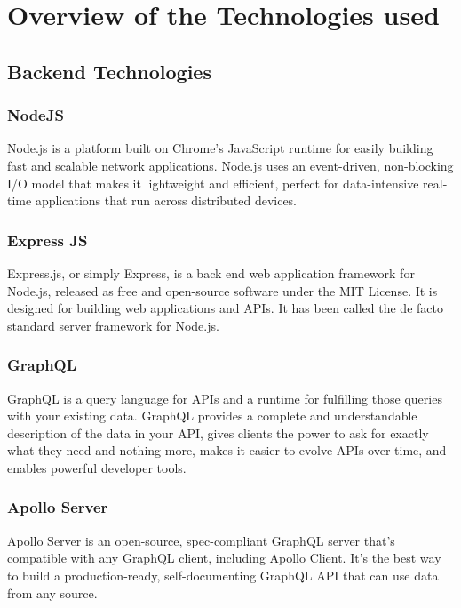 \section{Overview of the Technologies used}

\subsection{Backend Technologies}

    \subsubsection{NodeJS}
    Node.js is a platform built on Chrome's JavaScript runtime for easily building fast and scalable network applications. 
    Node.js uses an event-driven, non-blocking I/O model that makes it lightweight and efficient, perfect for data-intensive 
    real-time applications that run across distributed devices.

    \subsubsection{Express JS}
    Express.js, or simply Express, is a back end web application framework for Node.js, released as free and open-source software under the MIT License. 
    It is designed for building web applications and APIs.
    It has been called the de facto standard server framework for Node.js.

    \subsubsection{GraphQL}
    GraphQL is a query language for APIs and a runtime for fulfilling those queries with your existing data. 
    GraphQL provides a complete and understandable description of the data in your API, gives clients the power to ask for exactly what they need and nothing more, 
    makes it easier to evolve APIs over time, and enables powerful developer tools.

    \subsubsection{Apollo Server}
    Apollo Server is an open-source, spec-compliant GraphQL server that's compatible with any GraphQL client, including Apollo Client. 
    It's the best way to build a production-ready, self-documenting GraphQL API that can use data from any source.

